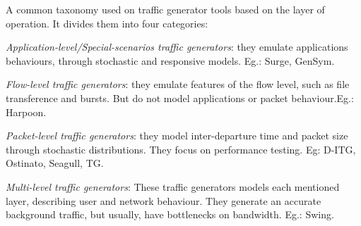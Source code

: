 
A common taxonomy used on traffic generator tools based on the layer of operation. It divides them into four categories\cite{do-you-trust}:

\textit{Application-level/Special-scenarios traffic generators}: they emulate applications behaviours, through stochastic and responsive models. Eg.: Surge, GenSym.

\textit{Flow-level traffic generators}: they emulate features of the flow level, such as file transference and bursts. But do not model applications or packet behaviour.Eg.: Harpoon.

\textit{Packet-level traffic generators}: they model inter-departure time and packet size  through stochastic distributions. They focus on performance testing. Eg: D-ITG\cite{ditg-paper}, Ostinato, Seagull, TG.

\textit{Multi-level traffic generators}: These traffic generators models each mentioned layer, describing user and network behaviour. They generate an accurate background traffic, but usually, have bottlenecks on bandwidth. Eg.: Swing\cite{swing-paper}.


